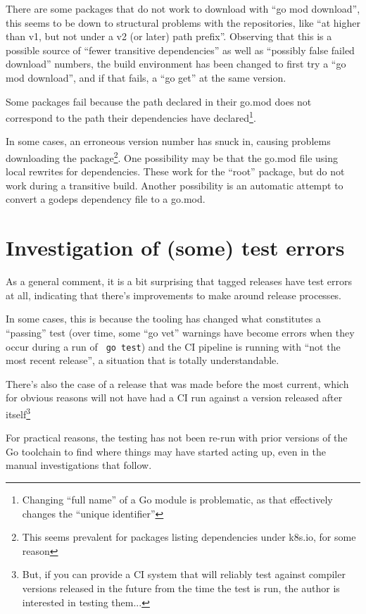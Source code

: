 \documentclass[a4paper]{paper}
\begin{document}
There are some packages that do not work to download with ``go mod
download'', this seems to be down to structural problems with the
repositories, like ``at higher than v1, but not under a v2 (or later)
path prefix''. Observing that this is a possible source of ``fewer
transitive dependencies'' as well as ``possibly false failed
download'' numbers, the build environment has been changed to first
try a ``go mod download'', and if that fails, a ``go get'' at the same
version.

Some packages fail because the path declared in their go.mod does not
correspond to the path their dependencies have
declared\footnote{Changing ``full name'' of a Go module is
  problematic, as that effectively changes the ``unique identifier''}.

In some cases, an erroneous version number has snuck in, causing
problems downloading the package\footnote{This seems prevalent for
  packages listing dependencies under k8s.io, for some reason}. One
possibility may be that the go.mod file using local rewrites for
dependencies. These work for the ``root'' package, but do not work
during a transitive build. Another possibility is an automatic attempt
to convert a godeps dependency file to a go.mod.



\section{Investigation of (some) test errors}

As a general comment, it is a bit surprising that tagged releases have
test errors at all, indicating that there's improvements to make
around release processes.

In some cases, this is because the tooling
has changed what constitutes a ``passing'' test (over time, some ``go
vet'' warnings have become errors when they occur during a run of {\tt
  go test}) and the CI pipeline is running with ``not the most recent
release'', a situation that is totally understandable.

There's also the case of a release
that was made before the most current, which for obvious reasons will
not have had a CI run against a version released after
itself\footnote{But, if you can provide a CI system that will reliably
  test against compiler versions released in the future from the time
  the test is run, the author is interested in testing them...}

For practical reasons, the testing has not been re-run with prior
versions of the Go toolchain to find where things may have started
acting up, even in the manual investigations that follow.
\end{document}
